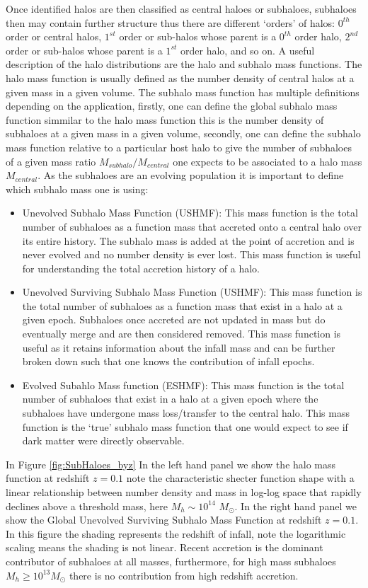 Once identified halos are then classified as central haloes or subhaloes, subhaloes then may contain further structure thus there are different `orders' of halos: $0^{th}$ order or central halos, $1^{st}$ order or sub-halos whose parent is a $0^{th}$ order halo, $2^{nd}$ order or sub-halos whose parent is a $1^{st}$ order halo, and so on. A useful description of the halo distributions are the halo and subhalo mass functions. The halo mass function is usually defined as the number density of central halos at a given mass in a given volume. The subhalo mass function has multiple definitions depending on the application, firstly, one can define the global subhalo mass function simmilar to the halo mass function this is the number density of subhaloes at a given mass in a given volume, secondly, one can define the subhalo mass function relative to a particular host halo to give the number of subhaloes of a given mass ratio $M_{subhalo}/M_{central}$ one expects to be associated to a halo mass $M_{central}$. As the subhaloes are an evolving population it is important to define which subhalo mass one is using:

\begin{itemize}
    \item Unevolved Subhalo Mass Function (USHMF): This mass function is the total number of subhaloes as a function mass that accreted onto a central halo over its entire history. The subhalo mass is added at the point of accretion and is never evolved and no number density is ever lost. This mass function is useful for understanding the total accretion history of a halo.
    \item Unevolved Surviving Subhalo Mass Function (USHMF): This mass function is the total number of subhaloes as a function mass that exist in a halo at a given epoch. Subhaloes once accreted are not updated in mass but do eventually merge and are then considered removed. This mass function is useful as it retains information about the infall mass and can be further broken down such that one knows the contribution of infall epochs.
    \item Evolved Subahlo Mass function (ESHMF): This mass function is the total number of subhaloes that exist in a halo at a given epoch where the subhaloes have undergone mass loss/transfer to the central halo. This mass function is the `true' subhalo mass function that one would expect to see if dark matter were directly observable.
\end{itemize}

In Figure \ref{fig:SubHaloes_byz} In the left hand panel we show the halo mass function at redshift $z=0.1$ note the characteristic shecter function shape with a linear relationship between number density and mass in log-log space that rapidly declines above a threshold mass, here $M_h\sim 10^{14}$ $M_{\odot}$. In the right hand panel we show the Global Unevolved Surviving Subhalo Mass Function at redshift $z=0.1$. In this figure the shading represents the redshift of infall, note the logarithmic scaling means the shading is not linear. Recent accretion is the dominant contributor of subhaloes at all masses, furthermore, for high mass subhaloes $M_h \geq 10^{13} M_{\odot}$ there is no contribution from high redshift accretion.

